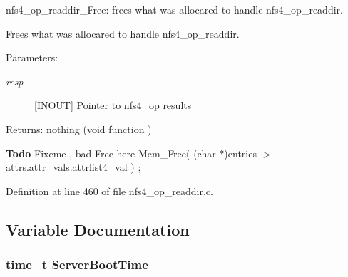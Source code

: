 nfs4\_\-op\_\-readdir\_\-Free: frees what was allocared to handle nfs4\_\-op\_\-readdir.

Frees what was allocared to handle nfs4\_\-op\_\-readdir.

\begin{Desc}
\item[Parameters:]
\begin{description}
\item[{\em resp}][INOUT] Pointer to nfs4\_\-op results\end{description}
\end{Desc}
\begin{Desc}
\item[Returns:]nothing (void function ) \end{Desc}


\begin{Desc}
\item[{\bf Todo}]Fixeme , bad Free here Mem\_\-Free( (char $\ast$)entries-$>$attrs.attr\_\-vals.attrlist4\_\-val ) ; \end{Desc}


Definition at line 460 of file nfs4\_\-op\_\-readdir.c.

\subsection{Variable Documentation}
\subsubsection[{ServerBootTime}]{\setlength{\rightskip}{0pt plus 5cm}time\_\-t {\bf ServerBootTime}}\label{nfs4__op__readdir_8c_7b4df488832bc1f60082b16b51472dc5}


